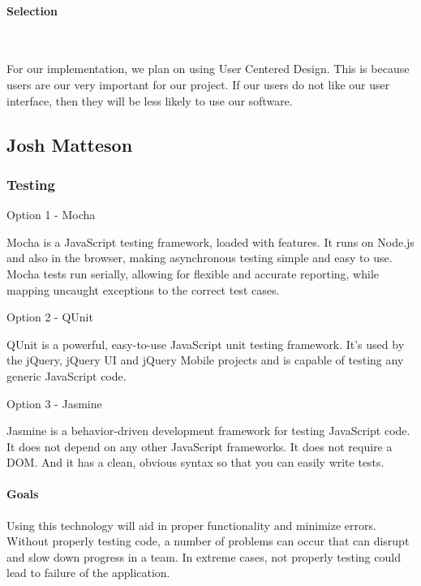 \documentclass[letterpaper, 10pt, draftclsnofoot, compsoc, onecolumn]{IEEEtran}
\begin{document}
{\medskip
\paragraph{Selection} ~\\
{\noindent For our implementation, we plan on using User Centered Design. This is because users are our very important for our project. If our users do not like our user interface, then they will be less likely to use our software. \par}








\newpage
\subsection{Josh Matteson}
\vspace{1pc}

\subsubsection{Testing}
{\noindent Option 1 - Mocha \par}
{\noindent Mocha is a JavaScript testing framework, loaded with features. It runs on Node.js and also in the browser, making asynchronous testing simple and easy to use. Mocha tests run serially, allowing for flexible and accurate reporting, while mapping uncaught exceptions to the correct test cases. \cite{Mocha} \par}

\medskip
{\noindent Option 2 - QUnit \par}
{\noindent QUnit is a powerful, easy-to-use JavaScript unit testing framework. It's used by the jQuery, jQuery UI and jQuery Mobile projects and is capable of testing any generic JavaScript code. \cite{QUnit}  \par}

\medskip
{\noindent Option 3 - Jasmine \par}
{\noindent Jasmine is a behavior-driven development framework for testing JavaScript code. It does not depend on any other JavaScript frameworks. It does not require a DOM. And it has a clean, obvious syntax so that you can easily write tests. \cite{Jasmine}  \par}

\medskip
\paragraph{Goals}
{\noindent Using this technology will aid in proper functionality and minimize errors. Without properly testing code, a number of problems can occur that can disrupt and slow down progress in a team. In extreme cases, not properly testing could lead to failure of the application. \par}

}
\end{document}
